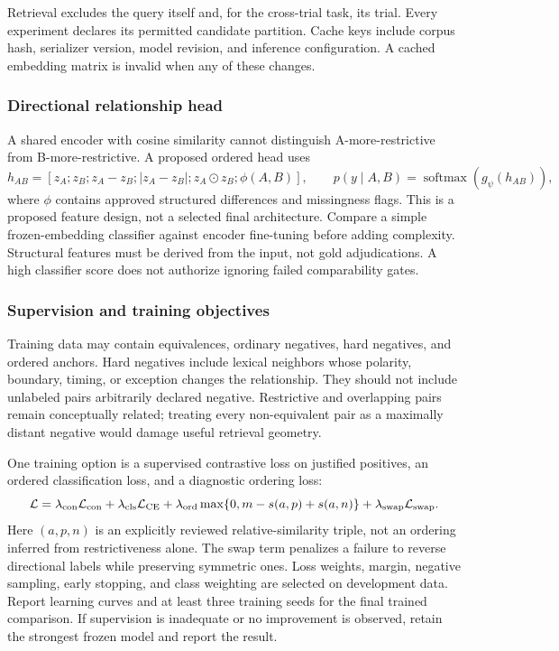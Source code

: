 \documentclass[10pt,letterpaper]{article}
\begin{document}
Retrieval excludes the query itself and, for the cross-trial task, its trial.
Every experiment declares its permitted candidate partition. Cache keys
include corpus hash, serializer version, model revision, and inference
configuration. A cached embedding matrix is invalid when any of these changes.

\subsubsection{Directional relationship head}
A shared encoder with cosine similarity cannot distinguish A-more-restrictive
from B-more-restrictive. A proposed ordered head uses
\[
 h_{AB}=[z_A;z_B;z_A-z_B;|z_A-z_B|;z_A\odot z_B;\phi(A,B)],\qquad
 p(y\mid A,B)=\operatorname{softmax}(g_{\psi}(h_{AB})),
\]
where $\phi$ contains approved structured differences and missingness flags.
This is a proposed feature design, not a selected final architecture.
Compare a simple frozen-embedding classifier against encoder fine-tuning
before adding complexity. Structural features must be derived from the input,
not gold adjudications. A high classifier score does not authorize ignoring
failed comparability gates.

\subsubsection{Supervision and training objectives}
Training data may contain equivalences, ordinary negatives, hard negatives,
and ordered anchors. Hard negatives include lexical neighbors whose polarity,
boundary, timing, or exception changes the relationship. They should not
include unlabeled pairs arbitrarily declared negative. Restrictive and
overlapping pairs remain conceptually related; treating every non-equivalent
pair as a maximally distant negative would damage useful retrieval geometry.

One training option is a supervised contrastive loss on justified positives,
an ordered classification loss, and a diagnostic ordering loss:
\[
 \mathcal L=\lambda_{\rm con}\mathcal L_{\rm con}
 +\lambda_{\rm cls}\mathcal L_{\rm CE}
 +\lambda_{\rm ord}\max\{0,m-s(a,p)+s(a,n)\}
 +\lambda_{\rm swap}\mathcal L_{\rm swap}.
\]
Here $(a,p,n)$ is an explicitly reviewed relative-similarity triple, not an
ordering inferred from restrictiveness alone. The swap term penalizes a
failure to reverse directional labels while preserving symmetric ones.
Loss weights, margin, negative sampling, early stopping, and class weighting
are selected on development data. Report learning curves and at least three
training seeds for the final trained comparison. If supervision is inadequate
or no improvement is observed, retain the strongest frozen model and report
the result.
\end{document}
